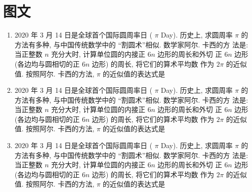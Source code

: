 \documentclass{ctexart}
\begin{document}
\section{图文}

\begin{enumerate}
  \item 2020 年 3 月 14 日是全球首个国际圆周率日 ( $\pi$ Day). 历史上, 求圆周率 $\pi$ 的方法有多种, 与中国传统数学中的 “割圆术”相似. 数学家阿尔. 卡西的方 法是: 当正整数 $n$ 充分大时, 计算单位圆的内接正 $6 n$ 边形的周长和外切 正 $6 n$ 边形 (各边均与圆相切的正 $6 n$ 边形) 的周长, 将它们的算术平均数 作为 $2 \pi$ 的近似值. 按照阿尔. 卡西的方法, $\pi$ 的近似值的表达式是 \xparen
  \item 2020 年 3 月 14 日是全球首个国际圆周率日 ( $\pi$ Day). 历史上, 求圆周率 $\pi$ 的方法有多种, 与中国传统数学中的 “割圆术”相似. 数学家阿尔. 卡西的方 法是: 当正整数 $n$ 充分大时, 计算单位圆的内接正 $6 n$ 边形的周长和外切 正 $6 n$ 边形 (各边均与圆相切的正 $6 n$ 边形) 的周长, 将它们的算术平均数 作为 $2 \pi$ 的近似值. 按照阿尔. 卡西的方法, $\pi$ 的近似值的表达式是 \xparen
  \item 2020 年 3 月 14 日是全球首个国际圆周率日 ( $\pi$ Day). 历史上, 求圆周率 $\pi$ 的方法有多种, 与中国传统数学中的 “割圆术”相似. 数学家阿尔. 卡西的方 法是: 当正整数 $n$ 充分大时, 计算单位圆的内接正 $6 n$ 边形的周长和外切 正 $6 n$ 边形 (各边均与圆相切的正 $6 n$ 边形) 的周长, 将它们的算术平均数 作为 $2 \pi$ 的近似值. 按照阿尔. 卡西的方法, $\pi$ 的近似值的表达式是 \xparen
\end{enumerate}
\end{document}
